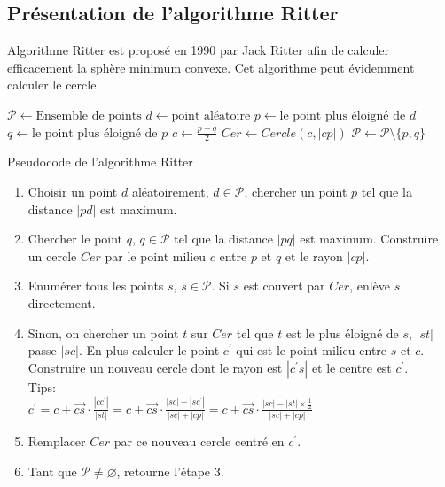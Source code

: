 \documentclass[14px]{article}
\begin{document}
\subsection{Présentation de l'algorithme Ritter}
Algorithme Ritter est proposé en 1990 par Jack Ritter afin de calculer efficacement la sphère minimum convexe. Cet algorithme peut évidemment calculer le cercle.

\begin{algorithm}
	$\mathcal{P} \gets \text{Ensemble de points}$\;
	$d \gets \text{point aléatoire}$\;
	$p \gets \text{le point plus éloigné de}$ $d$\;
	$q \gets \text{le point plus éloigné de}$ $p$\;
	$c \gets \frac{p + q}{2}$
	$Cer\gets Cercle(c,|cp|)$\;
	$\mathcal{P} \gets \mathcal{P}\setminus\{p, q\}$\;
	\;
	\caption{Pseudocode de l'algorithme Ritter}
\end{algorithm}
\begin{enumerate}
	\item Choisir un point $d$ aléatoirement, $d\in\mathcal{P}$, chercher un point $p$ tel que la distance $|pd|$ est maximum.
	\item Chercher le point $q$, $q\in\mathcal{P}$ tel que la distance $|pq|$ est maximum. Construire un cercle $Cer$ par le point milieu $c$ entre $p$ et $q$ et le rayon $|cp|$.
	\item Enumérer tous les points $s$, $s\in\mathcal{P}$. Si $s$ est couvert par $Cer$, enlève $s$ directement.
	\item Sinon, on chercher un point $t$ sur $Cer$ tel que $t$ est le plus éloigné de $s$, $|st|$ passe $|sc|$. En plus calculer le point $c^{\prime}$ qui est le point milieu entre $s$ et $c$. Construire un nouveau cercle dont le rayon est $|c^{\prime}s|$ et le centre est $c^{\prime}$.\\
	Tips:\\
	$c^{\prime} = c + \overrightarrow{cs}\cdot\frac{|cc^{\prime}|}{|st|} = c + \overrightarrow{cs}\cdot\frac{|sc| - |sc^{\prime}|}{|sc| + |cp|} = c + \overrightarrow{cs}\cdot\frac{|sc| - |st|\times\frac{1}{2}}{|sc| + |cp|}$
	\item Remplacer $Cer$ par ce nouveau cercle centré en $c^{\prime}$.
	\item Tant que $\mathcal{P}\neq\varnothing$, retourne l'étape 3.
\end{enumerate}
\end{document}
